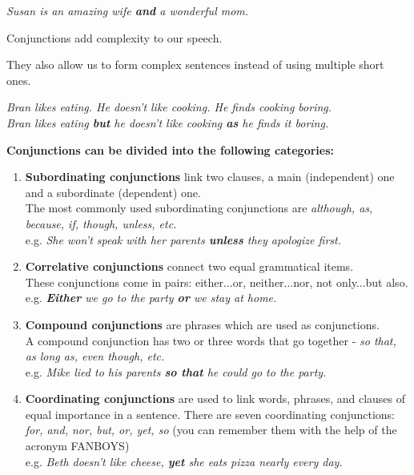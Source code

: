 \documentclass[hidelinks,10pt,a4paper]{article}
\begin{document}
\begin{center}
	\textit{Susan is an amazing wife \textbf{and} a wonderful mom.}
\end{center}

Conjunctions add complexity to our speech.

They also allow us to form complex sentences instead of using multiple short ones.

\begin{center}
	\textit{Bran likes eating. He doesn't like cooking. He finds cooking boring. \\
	Bran likes eating \textbf{but} he doesn't like cooking \textbf{as} he finds it boring.}
\end{center}

\textbf{Conjunctions can be divided into the following categories:}
\begin{enumerate}[label=(\alph*)]
	\item \textbf{Subordinating conjunctions} link two clauses, a main (independent) one and a subordinate (dependent) one.\\
		The most commonly used subordinating conjunctions are \textit{although, as, because, if, though, unless, etc.}\\
		e.g. \textit{She won't speak with her parents \textbf{unless} they apologize first.}
	\item \textbf{Correlative conjunctions} connect two equal grammatical items.\\
		These conjunctions come in pairs: either...or, neither...nor, not only...but also. \\
		e.g. \textit{\textbf{Either} we go to the party \textbf{or} we stay at home.}
	\item \textbf{Compound conjunctions} are phrases which are used as conjunctions. \\
		A compound conjunction has two or three words that go together - \textit{so that, as long as, even though, etc.}\\
		e.g. \textit{Mike lied to his parents \textbf{so that} he could go to the party.}
	\item \textbf{Coordinating conjunctions} are used to link words, phrases, and clauses of equal importance in a sentence. There are seven coordinating conjunctions: \textit{for, and, nor, but, or, yet, so} (you can remember them with the help of the acronym FANBOYS)\\
		e.g. \textit{Beth doesn't like cheese, \textbf{yet} she eats pizza nearly every day.}
\end{enumerate}
\end{document}
